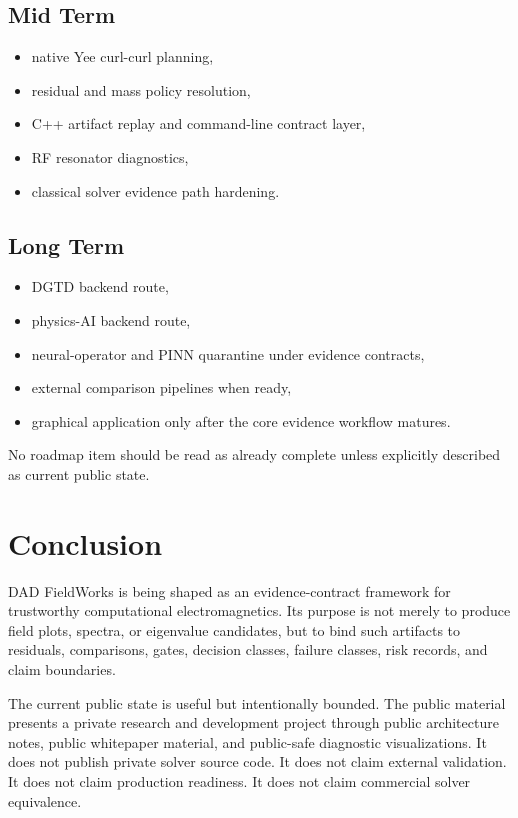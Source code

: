 \documentclass[11pt,a4paper]{article}
\begin{document}
\subsection{Mid Term}

\begin{itemize}
  \item native Yee curl-curl planning,
  \item residual and mass policy resolution,
  \item C++ artifact replay and command-line contract layer,
  \item RF resonator diagnostics,
  \item classical solver evidence path hardening.
\end{itemize}

\subsection{Long Term}

\begin{itemize}
  \item DGTD backend route,
  \item physics-AI backend route,
  \item neural-operator and PINN quarantine under evidence contracts,
  \item external comparison pipelines when ready,
  \item graphical application only after the core evidence workflow matures.
\end{itemize}

No roadmap item should be read as already complete unless explicitly described as current public state.

\section{Conclusion}

DAD FieldWorks is being shaped as an evidence-contract framework for trustworthy computational electromagnetics. Its purpose is not merely to produce field plots, spectra, or eigenvalue candidates, but to bind such artifacts to residuals, comparisons, gates, decision classes, failure classes, risk records, and claim boundaries.

The current public state is useful but intentionally bounded. The public material presents a private research and development project through public architecture notes, public whitepaper material, and public-safe diagnostic visualizations. It does not publish private solver source code. It does not claim external validation. It does not claim production readiness. It does not claim commercial solver equivalence.
\end{document}
